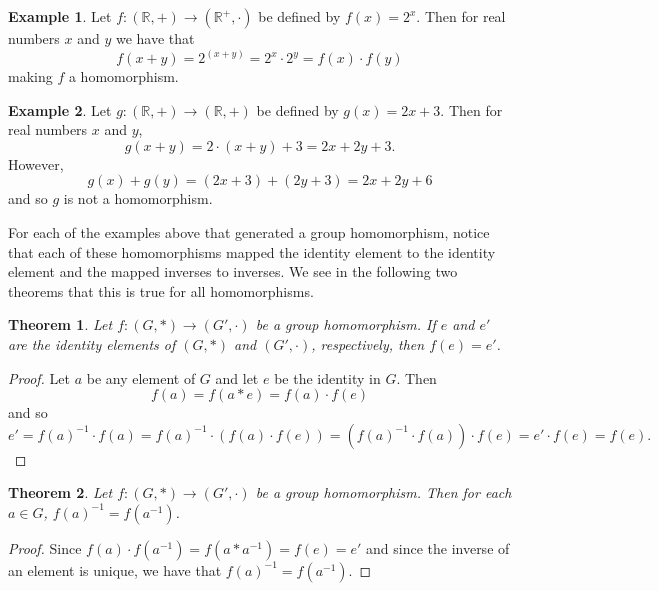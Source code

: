 \documentclass[
]{book}
\newtheorem{theorem}{Theorem}[chapter]
\theoremstyle{definition}
\theoremstyle{definition}
\newtheorem{example}{Example}[chapter]
\theoremstyle{definition}
\theoremstyle{remark}
\begin{document}
\begin{example}
\protect\hypertarget{exm:unnamed-chunk-158}{}{\label{exm:unnamed-chunk-158} }Let \(f: (\mathbb{R}, +) \rightarrow (\mathbb{R}^+, \cdot)\) be defined by \(f(x)=2^x\). Then for real numbers \(x\) and \(y\) we have that \[f(x+y)=2^{(x+y)} = 2^x \cdot 2^y = f(x) \cdot f(y)\] making \(f\) a homomorphism.
\end{example}

\begin{example}
\protect\hypertarget{exm:unnamed-chunk-159}{}{\label{exm:unnamed-chunk-159} }Let \(g: (\mathbb{R}, +) \rightarrow (\mathbb{R},+)\) be defined by \(g(x)=2x+3\). Then for real numbers \(x\) and \(y\), \[g(x+y) = 2\cdot (x+y)+3=2x+2y+3.\] However, \[g(x)+g(y)=(2x+3)+(2y+3)= 2x+2y+6\] and so \(g\) is not a homomorphism.
\end{example}

For each of the examples above that generated a group homomorphism, notice that each of these homomorphisms mapped the identity element to the identity element and the mapped inverses to inverses. We see in the following two theorems that this is true for all homomorphisms.

\begin{theorem}
\protect\hypertarget{thm:homomorphism-identity}{}{\label{thm:homomorphism-identity} }Let \(f:(G,*)\rightarrow (G',\cdot)\) be a group homomorphism. If \(e\) and \(e'\) are the identity elements of \((G,*)\) and \((G',\cdot)\), respectively, then \(f(e)=e'\).
\end{theorem}

\begin{proof}
{}Let \(a\) be any element of \(G\) and let \(e\) be the identity in \(G\). Then
\[f(a) = f(a*e) = f(a) \cdot f(e)\] and so \[e' = f(a)^{-1}\cdot f(a) = f(a)^{-1}\cdot ( f(a) \cdot f(e) ) = (f(a)^{-1} \cdot f(a))\cdot f(e) = e' \cdot f(e) = f(e).\]
\end{proof}

\begin{theorem}
\protect\hypertarget{thm:homomorphism-inverse}{}{\label{thm:homomorphism-inverse} }Let \(f:(G,*)\rightarrow (G',\cdot)\) be a group homomorphism. Then for each \(a\in G\), \(f(a)^{-1} = f\left(a^{-1}\right)\).
\end{theorem}

\begin{proof}
{}Since \(f(a) \cdot f\left(a^{-1}\right) = f\left(a*a^{-1}\right) = f(e) = e'\) and since the inverse of an element is unique, we have that \(f(a)^{-1} = f\left(a^{-1}\right)\).
\end{proof}
\end{document}
